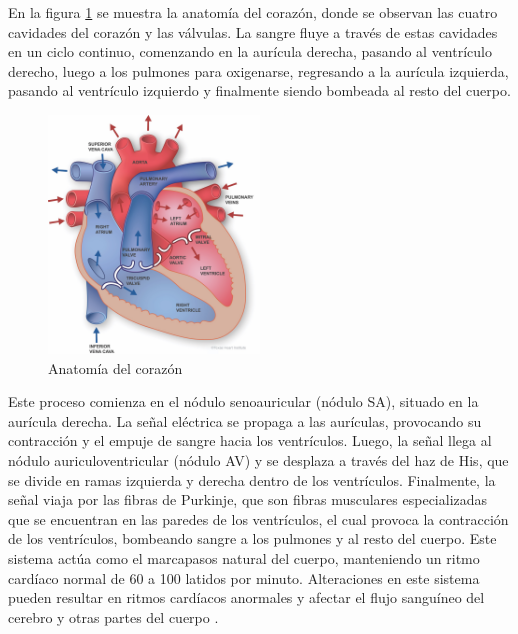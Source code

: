     En la figura \ref{fig:corazon} se muestra la anatomía del corazón, donde se observan las cuatro cavidades del corazón y las válvulas. La sangre fluye a través de estas cavidades en un ciclo continuo, comenzando en la aurícula derecha, pasando al ventrículo derecho, luego a los pulmones para oxigenarse, regresando a la aurícula izquierda, pasando al ventrículo izquierdo y finalmente siendo bombeada al resto del cuerpo.

    \begin{figure}[H]
        \centering
        \includegraphics[width=0.5\textwidth]{img/Marco/corazon.jpg}
        \caption[Anatomía del corazón]{Anatomía del corazón\footnotemark}
        \label{fig:corazon}
    \end{figure}

     Este proceso comienza en el nódulo senoauricular (nódulo SA), situado en la aurícula derecha. La señal eléctrica se propaga a las aurículas, provocando su contracción y el empuje de sangre hacia los ventrículos. Luego, la señal llega al nódulo auriculoventricular (nódulo AV) y se desplaza a través del haz de His, que se divide en ramas izquierda y derecha dentro de los ventrículos. Finalmente, la señal viaja por las fibras de Purkinje, que son fibras musculares especializadas que se encuentran en las paredes de los ventrículos, el cual provoca la contracción de los ventrículos, bombeando sangre a los pulmones y al resto del cuerpo. Este sistema actúa como el marcapasos natural del cuerpo, manteniendo un ritmo cardíaco normal de 60 a 100 latidos por minuto. Alteraciones en este sistema pueden resultar en ritmos cardíacos anormales y afectar el flujo sanguíneo del cerebro y otras partes del cuerpo \cite{SistemaConduccionMSD}.

